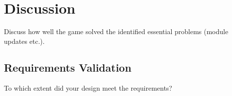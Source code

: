 \section{Discussion}
Discuss how well the game solved the identified essential problems (module updates etc.).

\subsection{Requirements Validation}
To which extent did your design meet the requirements?
